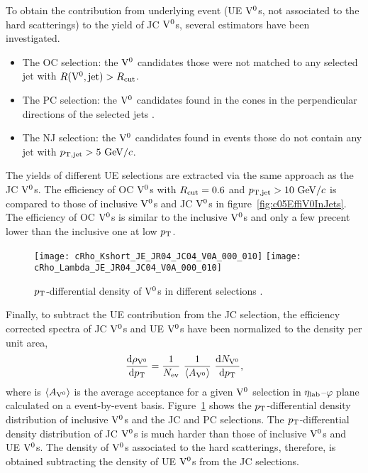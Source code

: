 To obtain the contribution from underlying event (UE ${\rm V}^{0}$s, not associated to the hard scatterings) to the yield of JC ${\rm V}^{0}$s, several estimators have been investigated.
\begin{itemize}
\item The OC selection: the ${\rm V}^{0}$ candidates those were not matched to any selected jet with $R({\rm V}^{0},{\rm jet})>R_{\rm cut}$.
\item The PC selection: the ${\rm V}^{0}$ candidates found in the cones in the perpendicular directions of the selected jets .
\item The NJ selection: the ${\rm V}^{0}$ candidates found in events those do not contain any jet with $\pT[jet]>5~\GeVc$.
\end{itemize}
The yields of different UE selections are extracted via the same approach as the JC ${\rm V}^{0}$s.
The efficiency of OC ${\rm V}^{0}$s with $R_{\rm cut}=0.6$ and $\pT[jet]>10~\GeVc$ is compared to those of inclusive ${\rm V}^{0}$s and JC ${\rm V}^{0}$s in figure~\ref{fig:c05EffiV0InJets}.
The efficiency of OC ${\rm V}^{0}$s is similar to the inclusive ${\rm V}^{0}$s and only a few precent lower than the inclusive one at low $\pT$.

\begin{figure}[t]
\begin{center}
\texttt{[image: cRho\_Kshort\_JE\_JR04\_JC04\_V0A\_000\_010]}
\texttt{[image: cRho\_Lambda\_JE\_JR04\_JC04\_V0A\_000\_010]}
\caption{$\pT$-differential density of ${\rm V}^{0}$s in different selections .}
\label{fig:c05SpecV0s}
\end{center}
\end{figure}

Finally, to subtract the UE contribution from the JC selection, the efficiency corrected spectra of JC ${\rm V}^{0}$s and UE ${\rm V}^{0}$s have been normalized to the density per unit area,
\begin{equation}
\frac{\dd\rho_{\Vzero}}{\dd\pT}=\frac{1}{N_{\rm ev}}~\frac{1}{\avg{A_{\Vzero}}}~\frac{\dd N_{\Vzero}}{\dd\pT},
\end{equation}
where is $\left\langle A_{{\rm V}^{0}}\right\rangle$ is the average acceptance for a given ${\rm V}^{0}$ selection in $\eta_{\rm lab}$--$\varphi$ plane calculated on a event-by-event basis.
Figure~\ref{fig:c05SpecV0s} shows the $\pT$-differential density distribution of inclusive ${\rm V}^{0}$s and the JC and PC selections.
The $\pT$-differential density distribution of JC ${\rm V}^{0}$s is much harder than those of inclusive ${\rm V}^{0}$s and UE ${\rm V}^{0}$s.
The density of ${\rm V}^{0}$s associated to the hard scatterings, therefore, is obtained subtracting the density of UE ${\rm V}^{0}$s from the JC selections.
